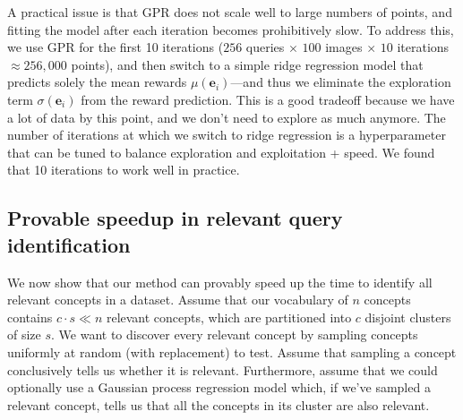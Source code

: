 
A practical issue is that GPR does not scale well to large numbers of points, and fitting the model after each iteration becomes prohibitively slow. To address this, we use GPR for the first 10 iterations ($256$ queries $\times$ $100$ images $\times$ $10$ iterations $\approx 256{,}000$ points), and then switch to a simple ridge regression model that predicts solely the mean rewards $\mu(\mathbf{e}_i)$---and thus we eliminate the exploration term $\sigma(\mathbf{e}_i)$ from the reward prediction. This is a good tradeoff because we have a lot of data by this point, and we don't need to explore as much anymore.
The number of iterations at which we switch to ridge regression is a hyperparameter that can be tuned to balance exploration and exploitation + speed. We found that 10 iterations to work well in practice.


\subsection{Provable speedup in relevant query identification}
\label{subsec:provable_speedup}
We now show that our method can provably speed up the time to identify all relevant concepts in a dataset.
Assume that our vocabulary of $n$ concepts contains $c \cdot s \ll n $ relevant concepts, which are partitioned into $c$ disjoint clusters of size $s$. We want to discover every relevant concept by sampling concepts uniformly at random (with replacement) to test. Assume that sampling a concept conclusively tells us whether it is relevant. Furthermore, assume that we could optionally use a Gaussian process regression model which, if we've sampled a relevant concept, tells us that all the concepts in its cluster are also relevant.\\

